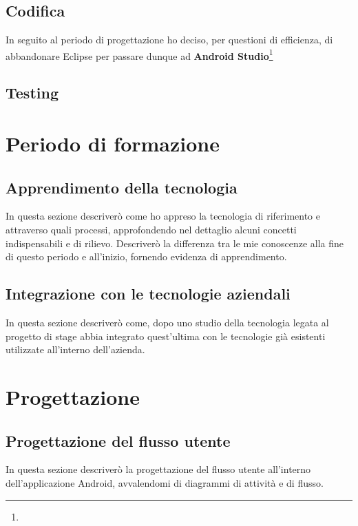\subsection*{Codifica}

In seguito al periodo di progettazione ho deciso, per questioni di efficienza, di abbandonare Eclipse per passare dunque ad \textbf{Android Studio}\footnote{}

\subsection*{Testing}

\section{Periodo di formazione}

\subsection{Apprendimento della tecnologia}

In questa sezione descriverò come ho appreso la tecnologia di riferimento e attraverso quali processi, approfondendo nel dettaglio alcuni concetti indispensabili e di rilievo. Descriverò la differenza tra le mie conoscenze alla fine di questo periodo e all'inizio, fornendo evidenza di apprendimento.

\subsection{Integrazione con le tecnologie aziendali}

In questa sezione descriverò come, dopo uno studio della tecnologia legata al progetto di stage abbia integrato quest'ultima con le tecnologie già esistenti utilizzate all'interno dell'azienda.

\section{Progettazione}

\subsection{Progettazione del flusso utente}

In questa sezione descriverò la progettazione del flusso utente all'interno dell'applicazione Android, avvalendomi di diagrammi di attività e di flusso.

